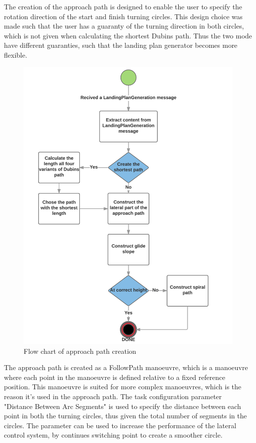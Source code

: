 The creation of the approach path is designed to enable the user to specify the rotation direction of the start and finish turning circles. This design choice was made such that the user has a guaranty of the turning direction in both circles, which is not given when calculating the shortest Dubins path. Thus the two mode have different guaranties, such that the landing plan generator becomes more flexible. 

\begin{figure}[H]
\centering
\includegraphics[scale=0.8]{figs/ApproachPath.png}
\caption{Flow chart of approach path creation}
\label{Fig:FlowChartApproach}
\end{figure}
The approach path is created as a FollowPath manoeuvre, which is a manoeuvre where each point in the manoeuvre is defined relative to a fixed reference position. This manoeuvre is suited for more complex manoeuvres, which is the reason it's used in the approach path. The task configuration parameter "Distance Between Arc Segments" is used to specify the distance between each point in both the turning circles, thus given the total number of segments in the circles. The parameter can be used to increase the performance of the lateral control system, by continues switching point to create a smoother circle.
